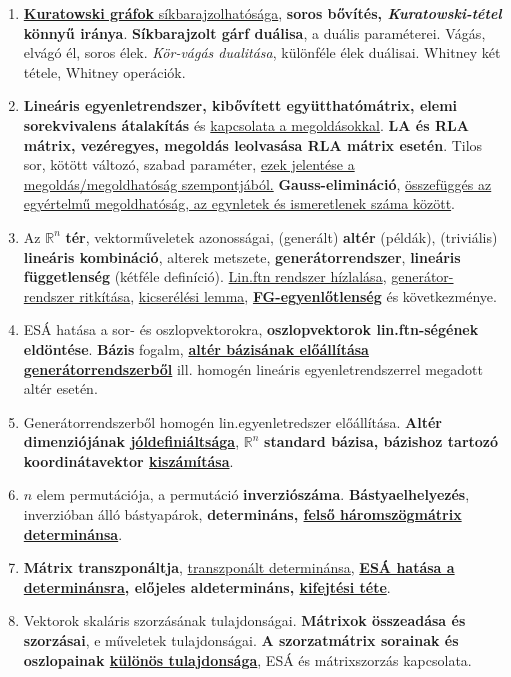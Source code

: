 \documentclass[10pt]{article}
\begin{document}
\begin{enumerate}
            \sloppy\item \underline{\textbf{Kuratowski gráfok} síkbarajzolhatósága}, \textbf{soros bővítés, \textit{Kuratowski-tétel} könnyű iránya}. \textbf{Síkbarajzolt gárf duálisa}, a duális paraméterei. Vágás, elvágó él, soros élek. \textit{Kör-vágás dualitása}, különféle élek duálisai. Whitney két tétele, Whitney operációk.
            \item \textbf{Lineáris egyenletrendszer, kibővített együtthatómátrix, elemi sorekvivalens átalakítás} és \underline{kapcsolata a megoldásokkal}. \textbf{LA és RLA mátrix, vezéregyes, megoldás leolvasása RLA mátrix esetén}. Tilos sor, kötött változó, szabad paraméter, \underline{ezek jelentése a megoldás/megoldhatóság szempontjából.} \textbf{Gauss-elimináció}, \underline{összefüggés az egyértelmű megoldhatóság, az egynletek és ismeretlenek száma között}.
            \item Az $\mathbb{R}^n$ \textbf{tér}, vektorműveletek azonosságai, (generált) \textbf{altér} (példák), (triviális) \textbf{lineáris kombináció}, alterek metszete, \textbf{generátorrendszer}, \textbf{lineáris függetlenség} (kétféle definíció). \underline{Lin.ftn rendszer hízlalása}, \underline{generátor-rendszer ritkítása}, \underline{kicserélési lemma}, \underline{\textbf{FG-egyenlőtlenség}} és következménye.
            \item ESÁ hatása a sor- és oszlopvektorokra, \textbf{oszlopvektorok lin.ftn-ségének eldöntése}. \textbf{Bázis} fogalm, \underline{\textbf{altér bázisának előállítása generátorrendszerből}} ill. homogén lineáris egyenletrendszerrel megadott altér esetén.
            \item Generátorrendszerből homogén lin.egyenletredszer előállítása. \textbf{Altér dimenziójának \underline{jóldefiniáltsága}}, $\mathbb{R}^n$ \textbf{standard bázisa, bázishoz tartozó koordinátavektor \underline{kiszámítása}}.
            \item $n$ elem permutációja, a permutáció \textbf{inverziószáma}. \textbf{Bástyaelhelyezés}, inverzióban álló bástyapárok, \textbf{determináns, \underline{felső háromszögmátrix determinánsa}}.
            \item \textbf{Mátrix transzponáltja}, \underline{transzponált determinánsa}, \textbf{\underline{ESÁ hatása a determinánsra}, előjeles aldetermináns, \underline{kifejtési téte}}.
            \item Vektorok skaláris szorzásának tulajdonságai. \textbf{Mátrixok összeadása és szorzásai}, e műveletek tulajdonságai. \textbf{A szorzatmátrix sorainak és oszlopainak \underline{különös tulajdonsága}}, ESÁ és mátrixszorzás kapcsolata.

\end{enumerate}
\end{document}
